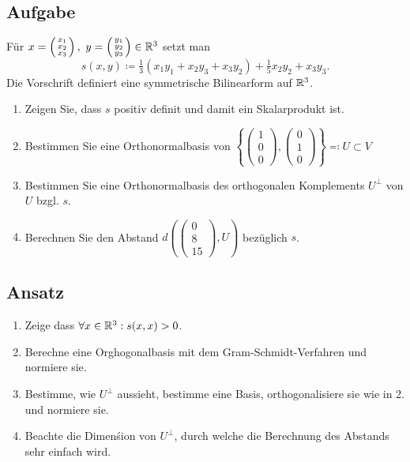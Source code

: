 \subsection{Aufgabe}
Für \( x = \left( \begin{smallmatrix}
	x_1 \\ x_2 \\ x_3
\end{smallmatrix} \right), \ y = \left( \begin{smallmatrix}
	y_1 \\ y_2 \\ y_3
\end{smallmatrix} \right) \in \mathbb{R}^3 \) setzt man
\begin{equation*}
	s(x,y) \coloneqq \tfrac{1}{3}(x_1y_1+x_2y_3+x_3y_2)+\tfrac{1}{5}x_2y_2+x_3y_3\text{.}
\end{equation*}
Die Vorschrift definiert eine symmetrische Bilinearform auf \( \mathbb{R}^3 \).
\begin{enumerate}
	\item Zeigen Sie, dass \( s \) positiv definit und damit ein Skalarprodukt ist.
	\item Bestimmen Sie eine Orthonormalbasis von \( \left\{ \left( \begin{smallmatrix}
		1 \\ 0 \\ 0
	\end{smallmatrix} \right), \left( \begin{smallmatrix}
		0 \\ 1 \\ 0
	\end{smallmatrix} \right) \right\} \eqqcolon U \subset V \)
	\item Bestimmen Sie eine Orthonormalbasis des orthogonalen Komplements \( U^\perp \) von \( U \) bzgl. \( s \).
	\item Berechnen Sie den Abstand \( d\left( \left( \begin{smallmatrix}
		0 \\ 8 \\ 15
	\end{smallmatrix} \right),U \right) \) bezüglich \( s \).
\end{enumerate}

\subsection{Ansatz}
\begin{enumerate}
	\item Zeige dass \( \forall x \in \mathbb{R}^3: s(x,x) > 0 \). 
	\item Berechne eine Orghogonalbasis mit dem Gram-Schmidt-Verfahren und normiere sie.
	\item Bestimme, wie \( U^\perp \) aussieht, bestimme eine Basis, orthogonalisiere sie wie in 2. und normiere sie.
	\item Beachte die Dimenśion von \( U^\perp \), durch welche die Berechnung des Abstands sehr einfach wird.
\end{enumerate}

